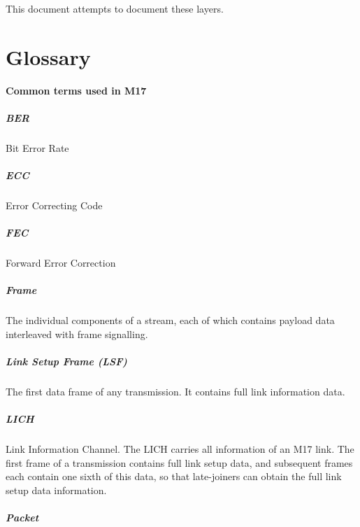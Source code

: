 \documentclass[a4paper,11pt,oneside]{book}
\begin{document}
This document attempts to document these layers.

\chapter{Glossary}

\textbf{Common terms used in M17}

\paragraph{BER}

Bit Error Rate

\paragraph{ECC}

Error Correcting Code

\paragraph{FEC}

Forward Error Correction

\paragraph{Frame}

The individual components of a stream, each of which contains payload data interleaved with frame signalling.

\paragraph{Link Setup Frame (LSF)}

The first data frame of any transmission. It contains full link information data.

\paragraph{LICH}

Link Information Channel. The LICH carries all information of an M17 link. The first frame of a transmission contains full link setup data, and subsequent frames each contain one sixth of this data, so that late-joiners can obtain the full link setup data information\@.

\paragraph{Packet}
\end{document}
